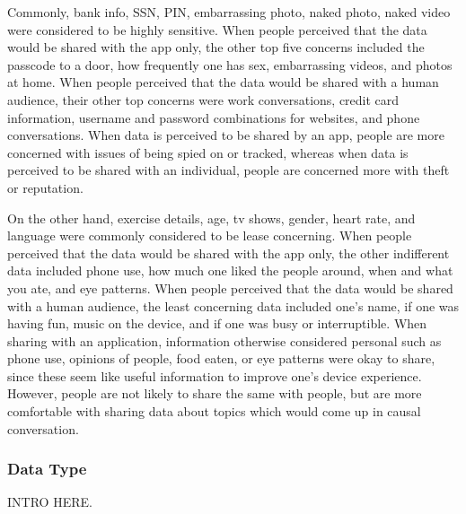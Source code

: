 \documentclass{acm_proc_article-sp}
\begin{document}
Commonly, bank info, SSN, PIN, embarrassing photo, naked photo, naked video were considered to be highly sensitive. When people perceived that the data would be shared with the app only, the other top five concerns included the passcode to a door, how frequently one has sex, embarrassing videos, and photos at home. When people perceived that the data would be shared with a human audience, their other top concerns were work conversations, credit card information, username and password combinations for websites, and phone conversations. When data is perceived to be shared by an app, people are more concerned with issues of being spied on or tracked, whereas when data is perceived to be shared with an individual, people are concerned more with theft or reputation. 

On the other hand, exercise details, age, tv shows, gender, heart rate, and language were commonly considered to be lease concerning. When people perceived that the data would be shared with the app only, the other indifferent data included phone use, how much one liked the people around, when and what you ate, and eye patterns. When people perceived that the data would be shared with a human audience, the least concerning data included one's name, if one was having fun, music on the device, and if one was busy or interruptible. When sharing with an application, information otherwise considered personal such as phone use, opinions of people, food eaten, or eye patterns were okay to share, since these seem like useful information to improve one's device experience. However, people are not likely to share the same with people, but are more comfortable with sharing data about topics which would come up in causal conversation.


\subsubsection{Data Type}
INTRO HERE. 
\end{document}
